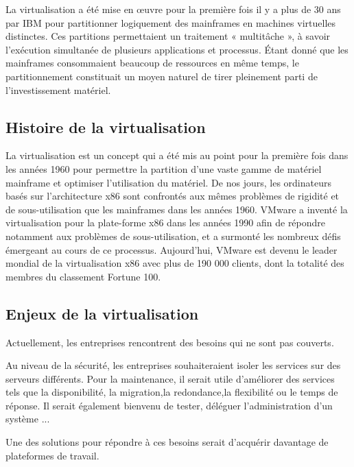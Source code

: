 La virtualisation a été mise en œuvre pour la première fois il y
a plus de 30 ans par IBM pour partitionner logiquement des mainframes
en machines virtuelles distinctes. Ces partitions permettaient un
traitement « multitâche », à savoir l'exécution simultanée de plusieurs applications et processus. Étant donné que les mainframes consommaient beaucoup de ressources en même temps, le partitionnement constituait un moyen naturel de tirer pleinement parti de l'investissement matériel.


\subsection{Histoire de la virtualisation}

La virtualisation est un concept qui a été mis au point pour la première fois dans les années 1960 pour permettre la partition d'une vaste gamme de matériel mainframe et optimiser l'utilisation du matériel. De nos jours, les ordinateurs basés sur l'architecture x86 sont confrontés aux mêmes problèmes de rigidité et de sous-utilisation que les mainframes dans les années 1960. VMware a inventé la virtualisation pour la plate-forme x86 dans les années 1990 afin de répondre notamment aux problèmes de sous-utilisation, et a surmonté les nombreux défis émergeant au cours de ce processus. Aujourd'hui, VMware est devenu le leader mondial de la virtualisation x86 avec plus de 190 000 clients, dont la totalité des membres du classement Fortune 100.

\subsection{Enjeux de la virtualisation}

Actuellement, les entreprises rencontrent des besoins qui ne sont
pas couverts.

Au niveau de la sécurité, les entreprises souhaiteraient isoler les
services sur des serveurs différents. Pour la maintenance, il serait
utile d'améliorer des services tels que la disponibilité, la migration,la redondance,la flexibilité ou le temps de réponse. Il serait également bienvenu de tester, déléguer l'administration d'un système ...


Une des solutions pour répondre à ces besoins serait d'acquérir davantage de plateformes de travail.


